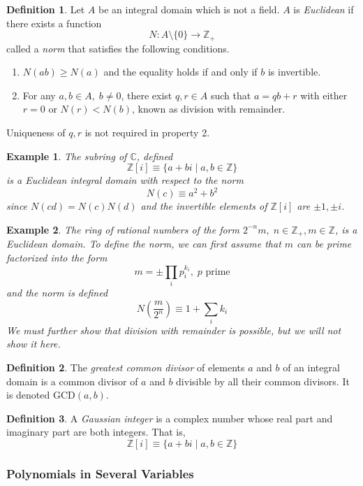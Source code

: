 \documentclass{article}
\newtheorem{example}{Example}[section]
\theoremstyle{remark}
\theoremstyle{definition}
\newtheorem{definition}{Definition}[section]
\begin{document}
\begin{definition}
Let $A$ be an integral domain which is not a field. $A$ is \textit{Euclidean} if there exists a function 
\[ N: A \setminus \{ 0 \} \longrightarrow \mathbb{Z}_+\]
called a \textit{norm} that satisfies the following conditions. 
\begin{enumerate}
    \item $N(a b) \geq N(a)$ and the equality holds if and only if $b$ is invertible. 
    \item For any $a, b \in A, \; b \neq 0$, there exist $q, r \in A$ such that $a = q b + r$ with either $r = 0$ or $ N(r) < N(b)$, known as division with remainder. 
\end{enumerate}
Uniqueness of $q, r$ is not required in property 2. 
\end{definition}

\begin{example}
The subring of $\mathbb{C}$, defined
\[ \mathbb{Z}[i] \equiv \{ a + b i \; | \; a, b \in \mathbb{Z} \} \]
is a Euclidean integral domain with respect to the norm 
\[ N(c) \equiv a^2 + b^2\]
since $N(c d) = N(c) N(d)$ and the invertible elements of $\mathbb{Z}[i]$ are $\pm 1, \pm i$. 
\end{example}

\begin{example}
The ring of rational numbers of the form $2^{-n} m, \; n \in \mathbb{Z}_+, m \in \mathbb{Z}$, is a Euclidean domain. To define the norm, we can first assume that $m$ can be prime factorized into the form 
\[ m = \pm \prod_{i} p_{i}^{k_i}, \; p \text{ prime}\]
and the norm is defined 
\[ N(\frac{m}{2^n}) \equiv 1 + \sum_i k_i\]
We must further show that division with remainder is possible, but we will not show it here. 
\end{example}

\begin{definition}
The \textit{greatest common divisor} of elements $a$ and $b$ of an integral domain is a common divisor of $a$ and $b$ divisible by all their common divisors. It is denoted GCD$(a, b)$. 
\end{definition}

\begin{definition}
A \textit{Gaussian integer} is a complex number whose real part and imaginary part are both integers. That is, 
\[\mathbb{Z}[i] \equiv \{a + b i \;|\; a, b \in \mathbb{Z} \}\]
\end{definition}

\subsubsection{Polynomials in Several Variables}
\end{document}
